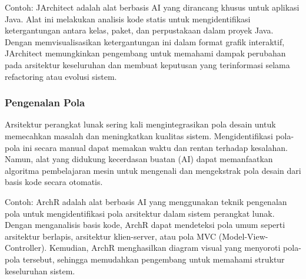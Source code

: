 \documentclass{article}
\begin{document}
Contoh: JArchitect adalah alat berbasis AI yang dirancang khusus untuk aplikasi Java. Alat ini melakukan analisis kode statis untuk mengidentifikasi ketergantungan antara kelas, paket, dan perpustakaan dalam proyek Java. Dengan memvisualisasikan ketergantungan ini dalam format grafik interaktif, JArchitect memungkinkan pengembang untuk memahami dampak perubahan pada arsitektur keseluruhan dan membuat keputusan yang terinformasi selama refactoring atau evolusi sistem.

\subsubsection{Pengenalan Pola}
Arsitektur perangkat lunak sering kali mengintegrasikan pola desain untuk memecahkan masalah dan meningkatkan kualitas sistem. Mengidentifikasi pola-pola ini secara manual dapat memakan waktu dan rentan terhadap kesalahan. Namun, alat yang didukung kecerdasan buatan (AI) dapat memanfaatkan algoritma pembelajaran mesin untuk mengenali dan mengekstrak pola desain dari basis kode secara otomatis.

Contoh: ArchR adalah alat berbasis AI yang menggunakan teknik pengenalan pola untuk mengidentifikasi pola arsitektur dalam sistem perangkat lunak. Dengan menganalisis basis kode, ArchR dapat mendeteksi pola umum seperti arsitektur berlapis, arsitektur klien-server, atau pola MVC (Model-View-Controller). Kemudian, ArchR menghasilkan diagram visual yang menyoroti pola-pola tersebut, sehingga memudahkan pengembang untuk memahami struktur keseluruhan sistem.
\end{document}
